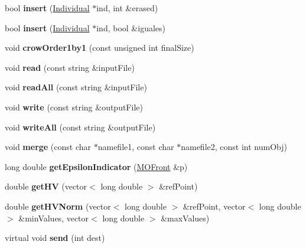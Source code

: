 \begin{DoxyCompactItemize}
bool {\bfseries insert} (\mbox{\hyperlink{classIndividual}{Individual}} $\ast$ind, int \&erased)
\item 
\mbox{\label{classMOFront_a1559ec3227b41a0f348b4d1cae71783e}} 
bool {\bfseries insert} (\mbox{\hyperlink{classIndividual}{Individual}} $\ast$ind, bool \&iguales)
\item 
\mbox{\label{classMOFront_aa33a397a31fbd775168f691a0828f954}} 
void {\bfseries crow\+Order1by1} (const unsigned int final\+Size)
\item 
\mbox{\label{classMOFront_ab27b35b65fbfd65993462568b6ad81d3}} 
void {\bfseries read} (const string \&input\+File)
\item 
\mbox{\label{classMOFront_afd58e468b58c2a4f650f91b4c07bf68e}} 
void {\bfseries read\+All} (const string \&input\+File)
\item 
\mbox{\label{classMOFront_a2c38a2d98c28bcb899b6279d149ed51c}} 
void {\bfseries write} (const string \&output\+File)
\item 
\mbox{\label{classMOFront_a15f916b2c26d83f6baed6772d77e8829}} 
void {\bfseries write\+All} (const string \&output\+File)
\item 
\mbox{\label{classMOFront_a0a3254c4f613c217bd5e7cc8206cd995}} 
void {\bfseries merge} (const char $\ast$namefile1, const char $\ast$namefile2, const int num\+Obj)
\item 
\mbox{\label{classMOFront_a8e13630dafd4fa986796f6766e68f684}} 
long double {\bfseries get\+Epsilon\+Indicator} (\mbox{\hyperlink{classMOFront}{M\+O\+Front}} \&p)
\item 
\mbox{\label{classMOFront_a6968b9c5fa1159392cf75e0b4a33aa02}} 
double {\bfseries get\+HV} (vector$<$ long double $>$ \&ref\+Point)
\item 
\mbox{\label{classMOFront_ae78dc1ff72ee703c78533cf0615f1396}} 
double {\bfseries get\+H\+V\+Norm} (vector$<$ long double $>$ \&ref\+Point, vector$<$ long double $>$ \&min\+Values, vector$<$ long double $>$ \&max\+Values)
\item 
\mbox{\label{classMOFront_a1512db1a446a937cea76957a010560d5}} 
virtual void {\bfseries send} (int dest)
\end{DoxyCompactItemize}
